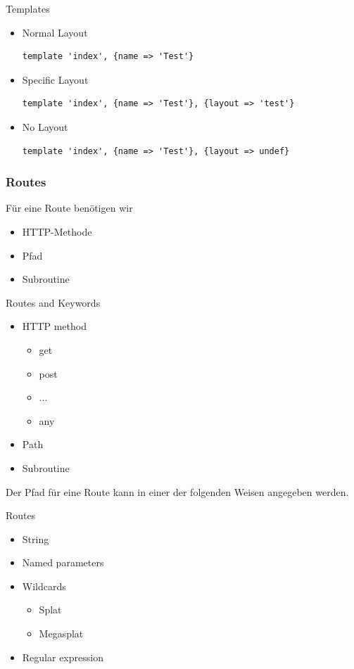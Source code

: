 \begin{frame}[fragile]{Templates}
\begin{itemize}
\item Normal Layout
\begin{lstlisting}
template 'index', {name => 'Test'}
\end{lstlisting}
\item Specific Layout
\begin{lstlisting}
template 'index', {name => 'Test'}, {layout => 'test'}
\end{lstlisting}
\item No Layout
\begin{lstlisting}
template 'index', {name => 'Test'}, {layout => undef}
\end{lstlisting}
\end{itemize}
\end{frame}

\subsubsection{Routes}

Für eine Route benötigen wir

\begin{itemize}
\item HTTP-Methode
\item Pfad
\item Subroutine
\end{itemize}

\begin{frame}{Routes and Keywords}
\begin{itemize}
\item HTTP method
\begin{itemize}
\item get
\item post
\item ...
\item any
\end{itemize}
\item Path
\item Subroutine
\end{itemize}
\end{frame}

Der Pfad für eine Route kann in einer der folgenden
Weisen angegeben werden.

\begin{frame}{Routes}
\begin{itemize}
\item String
\item Named parameters
\item Wildcards 
\begin{itemize}
\item Splat
\item Megasplat
\end{itemize}
\item Regular expression
\end{itemize}
\end{frame}

